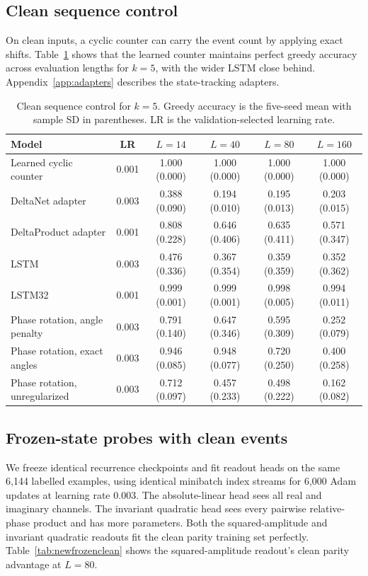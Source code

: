 \subsection{Clean sequence control}
On clean inputs, a cyclic counter can carry the event count by applying exact
shifts. Table~\ref{tab:newseq5} shows that the learned counter maintains perfect
greedy accuracy across evaluation lengths for $k=5$, with the wider LSTM
close behind.
Appendix~\ref{app:adapters} describes the state-tracking adapters.

\begin{table}[H]
\centering\small
\caption{Clean sequence control for $k=5$. Greedy accuracy is the five-seed mean
with sample SD in parentheses. LR is the validation-selected learning rate.}
\label{tab:newseq5}
\setlength{\tabcolsep}{3pt}
\begin{tabular}{lccccc}
\toprule
Model & LR & $L=14$ & $L=40$ & $L=80$ & $L=160$ \\
\midrule
Learned cyclic counter & 0.001 & 1.000 (0.000) & 1.000 (0.000) & 1.000 (0.000) & 1.000 (0.000) \\
DeltaNet adapter & 0.003 & 0.388 (0.090) & 0.194 (0.010) & 0.195 (0.013) & 0.203 (0.015) \\
DeltaProduct adapter & 0.001 & 0.808 (0.228) & 0.646 (0.406) & 0.635 (0.411) & 0.571 (0.347) \\
LSTM & 0.003 & 0.476 (0.336) & 0.367 (0.354) & 0.359 (0.359) & 0.352 (0.362) \\
LSTM32 & 0.001 & 0.999 (0.001) & 0.999 (0.001) & 0.998 (0.005) & 0.994 (0.011) \\
Phase rotation, angle penalty & 0.003 & 0.791 (0.140) & 0.647 (0.346) & 0.595 (0.309) & 0.252 (0.079) \\
Phase rotation, exact angles & 0.003 & 0.946 (0.085) & 0.948 (0.077) & 0.720 (0.250) & 0.400 (0.258) \\
Phase rotation, unregularized & 0.003 & 0.712 (0.097) & 0.457 (0.233) & 0.498 (0.222) & 0.162 (0.082) \\
\bottomrule
\end{tabular}
\end{table}

\subsection{Frozen-state probes with clean events}
\label{app:clean-probes}
We freeze identical recurrence checkpoints and fit readout heads on the same
6,144 labelled examples, using identical minibatch index streams for 6,000 Adam
updates at learning rate $0.003$.
The absolute-linear head sees all real and imaginary channels. The invariant
quadratic head sees every pairwise relative-phase product and has more parameters.
Both the squared-amplitude and invariant quadratic readouts fit the clean
parity training set perfectly. Table~\ref{tab:newfrozenclean} shows the
squared-amplitude readout's clean parity advantage at $L=80$.

